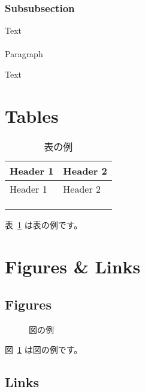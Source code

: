 \documentclass[
  japanese,
  letterpaper,
  lualatex,
  ja=standard,
  10pt,
  a4paper,
  textwidth-limit=50,
  openany]{bxjsbook}
\makeatletter
\let\oldparagraph\paragraph
\renewcommand{\paragraph}{
    \@ifstar
      \xxxParagraphStar
      \xxxParagraphNoStar
  }
\newcommand{\xxxParagraphStar}[1]{\oldparagraph*{#1}\mbox{}}
\newcommand{\xxxParagraphNoStar}[1]{\oldparagraph{#1}\mbox{}}
\makeatother
\begin{document}
\subsubsection{Subsubsection}\label{subsubsection-1}

Text

\paragraph{Paragraph}\label{paragraph-1}

Text

\section{Tables}\label{tables-1}

\begin{longtable}[]{@{}ll@{}}
\caption{表の例}\label{tbl-yyy}\tabularnewline
\toprule\noalign{}
Header 1 & Header 2 \\
\midrule\noalign{}
\endfirsthead
\toprule\noalign{}
Header 1 & Header 2 \\
\midrule\noalign{}
\endhead
\bottomrule\noalign{}
\endlastfoot
& \\
& \\
& \\
\end{longtable}

表~\ref{tbl-yyy} は表の例です。

\section{Figures \& Links}\label{figures-links-1}

\subsection{Figures}\label{figures-1}

\begin{figure}[H]


\caption{\label{fig-yyy}図の例}

\end{figure}%

図~\ref{fig-yyy} は図の例です。

\subsection{Links}\label{links-1}
\end{document}

